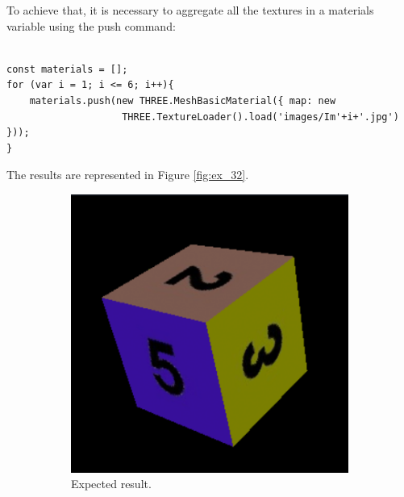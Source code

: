 \documentclass[12pt]{article}
\begin{document}
To achieve that, it is necessary to aggregate all the textures in a materials variable using the push command:
\begin{lstlisting}

const materials = [];
for (var i = 1; i <= 6; i++){
    materials.push(new THREE.MeshBasicMaterial({ map: new
                    THREE.TextureLoader().load('images/Im'+i+'.jpg') }));
}

\end{lstlisting}

The results are represented in Figure \ref{fig:ex_32}.

\begin{figure}[!h]
\centering
    \begin{subfigure}{.5\textwidth}
        \centering
        \includegraphics[width = \textwidth]{figs/ex_32_1.png}
        \caption{Expected result.}
        \label{fig:ex_32_1}
    \end{subfigure}%
    \begin{subfigure}{.5\textwidth}
        \centering

\end{subfigure}
\end{figure}
\end{document}
